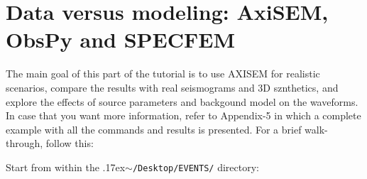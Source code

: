 \documentclass{article}
\newcommand{\ttilde}[0]{\raise.17ex\hbox{$\scriptstyle\sim$}}
\begin{document}

\newpage

\section{Data versus modeling: AxiSEM, ObsPy and SPECFEM}
The main goal of this part of the tutorial is to use AXISEM for realistic scenarios, 
compare the results with real seismograms and 3D sznthetics, and 
explore the effects of source parameters and backgound model on the waveforms. 
In case that you want more information, 
refer to Appendix-5 in which a complete example with all the commands and results is presented.
For a brief walk-through, follow this:

Start from within the \ttilde\verb|/Desktop/EVENTS/| directory:
\end{document}
